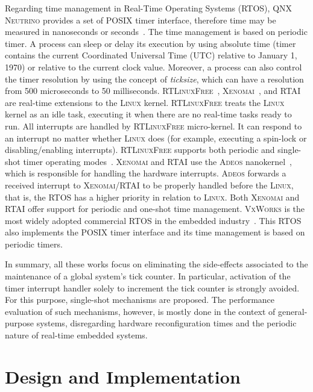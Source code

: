 \documentclass[final,3pd,times]{elsarticle}
\begin{document}
Regarding time management in Real-Time Operating Systems (RTOS),
\textsc{QNX Neutrino} provides a set of POSIX timer interface, therefore
time may be measured in nanoseconds or seconds~\cite{QNX}. The time
management is based on periodic timer.  A process can sleep or delay its
execution by using absolute time (timer contains the current Coordinated
Universal Time (UTC) relative to January 1, 1970) or relative to the
current clock value. Moreover, a process can also control the timer
resolution by using the concept of \emph{ticksize}, which can have a
resolution from 500 microseconds to 50 milliseconds.
\textsc{RTLinuxFree}~\cite{RTLinuxFree},
\textsc{Xenomai}~\cite{Xenomai}, and \textsc{RTAI}~\cite{Cloutier:00}
are real-time extensions to the \textsc{Linux} kernel.
\textsc{RTLinuxFree} treats the \textsc{Linux} kernel as an idle task,
executing it when there are no real-time tasks ready to run. All
interrupts are handled by \textsc{RTLinuxFree} micro-kernel. It can
respond to an interrupt no matter whether \textsc{Linux} does (for
example, executing a spin-lock or disabling/enabling interrupts).
\textsc{RTLinuxFree} supports both periodic and single-shot timer
operating modes~\cite{Kairui:2006}.  \textsc{Xenomai} and \textsc{RTAI}
use the \textsc{Adeos} nanokernel~\cite{Karim:2001}, which is
responsible for handling the hardware interrupts. \textsc{Adeos}
forwards a received interrupt to \textsc{Xenomai}/\textsc{RTAI} to be
properly handled before the \textsc{Linux}, that is,
the RTOS has a higher priority in relation to \textsc{Linux}. Both \textsc{Xenomai} and
\textsc{RTAI} offer support for periodic and one-shot time management.
\textsc{VxWorks} is the most widely adopted commercial RTOS in the
embedded industry~\cite{VxWorks}. This RTOS also implements the POSIX
timer interface and its time management is based on periodic timers.

In summary, all these works focus on eliminating the side-effects
associated to the maintenance of a global system's tick counter.  In
particular, activation of the timer interrupt handler solely to
increment the tick counter is strongly avoided. For this purpose,
single-shot mechanisms are proposed. The performance evaluation of such
mechanisms, however, is mostly done in the context of general-purpose
systems, disregarding hardware reconfiguration times and the periodic
nature of real-time embedded systems.


\section{Design and Implementation} \label{sec:design}
\end{document}
